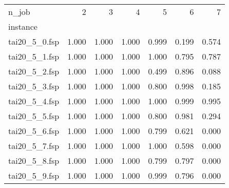 \begin{tabular}{lrrrrrr}
\toprule
n_job & 2 & 3 & 4 & 5 & 6 & 7 \\
instance &  &  &  &  &  &  \\
\midrule
tai20_5_0.fsp & 1.000 & 1.000 & 1.000 & 0.999 & 0.199 & 0.574 \\
tai20_5_1.fsp & 1.000 & 1.000 & 1.000 & 1.000 & 0.795 & 0.787 \\
tai20_5_2.fsp & 1.000 & 1.000 & 1.000 & 0.499 & 0.896 & 0.088 \\
tai20_5_3.fsp & 1.000 & 1.000 & 1.000 & 0.800 & 0.998 & 0.185 \\
tai20_5_4.fsp & 1.000 & 1.000 & 1.000 & 1.000 & 0.999 & 0.995 \\
tai20_5_5.fsp & 1.000 & 1.000 & 1.000 & 0.800 & 0.981 & 0.294 \\
tai20_5_6.fsp & 1.000 & 1.000 & 1.000 & 0.799 & 0.621 & 0.000 \\
tai20_5_7.fsp & 1.000 & 1.000 & 1.000 & 1.000 & 0.598 & 0.000 \\
tai20_5_8.fsp & 1.000 & 1.000 & 1.000 & 0.799 & 0.797 & 0.000 \\
tai20_5_9.fsp & 1.000 & 1.000 & 1.000 & 0.999 & 0.796 & 0.000 \\
\bottomrule
\end{tabular}
